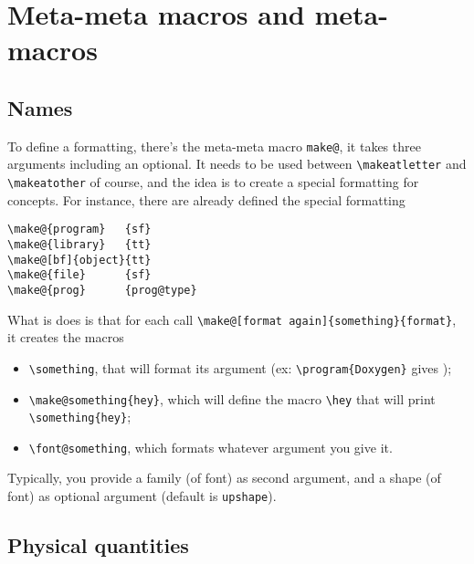 \documentclass{documentation}
\begin{document}
\section[sec_2]{Meta-meta macros and meta-macros}

\subsection{Names}

To define a formatting, there's the meta-meta macro \verb!make@!, it takes
three arguments including an optional. It needs to be used between
\verb!\makeatletter! and \verb!\makeatother! of course, and the
idea is to create a special formatting for concepts. For instance,
there are already defined the special formatting
\begin{verbatim}
\make@{program}   {sf}
\make@{library}   {tt}
\make@[bf]{object}{tt}
\make@{file}      {sf}
\make@{prog}      {prog@type}
\end{verbatim}

What is does is that for each call \verb!\make@[format again]{something}{format}!, it creates
the macros
\begin{itemize}
\item \verb!\something!, that will format its argument 
        (ex: \verb!\program{Doxygen}! gives );
\item \verb!\make@something{hey}!, which will define the macro \verb!\hey! that
        will print \verb!\something{hey}!;
\item \verb!\font@something!, which formats whatever argument you give it.
\end{itemize}
Typically, you provide a family (of font) as second argument, and a shape (of font)
as optional argument (default is \verb!upshape!).

\subsection{Physical quantities}
\end{document}
